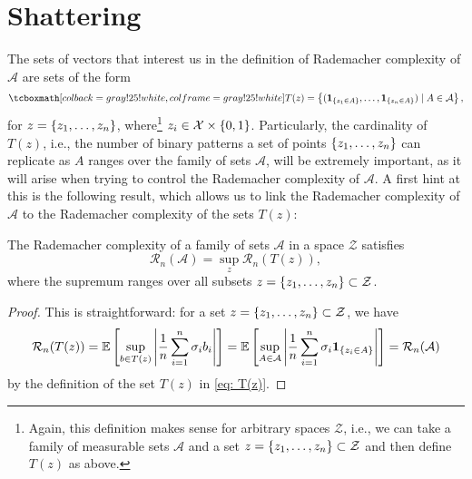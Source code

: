 \section{Shattering}
\label{sec: shattering}

The sets of vectors that interest us in the definition of Rademacher complexity of
$\mathcal{A}$ are sets of the form
\begin{equation}
\label{eq: T(z)}
    \highlightMath{
        T(z) = \set{(\indSet{z_1 \in A}, \dots, \indSet{z_n \in A}) \with A \in \mathcal{A}},
    }
\end{equation}
for $z = \left\{z_1, \dots, z_n\right\}$, where\footnote{Again, this definition makes sense for arbitrary spaces $\mathcal{Z}$, i.e., we can take a family of measurable sets $\mathcal{A}$ and a set $z = \left\{z_1, \dots, z_n\right\} \subset \mathcal{Z}$ and then define $T(z)$ as above.} $z_i \in \mathcal{X} \times \left\{0, 1\right\}$. Particularly, the cardinality of $T(z)$, i.e., the number of binary patterns a set of points $\left\{z_1, \dots, z_n\right\}$ can replicate as $A$ ranges over the family of sets $\mathcal{A}$, will be extremely important, as it will arise when trying to control the Rademacher complexity of $\mathcal{A}$. A first hint at this is the following result, which allows us to link the Rademacher complexity of $\mathcal{A}$ to the Rademacher complexity of the sets $T(z)$:

\begin{lemma}
\label{lem: rademacher complexity of family of sets}
The Rademacher complexity of a family of sets $\mathcal{A}$ in a space $\mathcal{Z}$ satisfies
\[
    \mathcal{R}_n(\mathcal{A}) = \sup_z \mathcal{R}_n(T(z)),
\]
where the supremum ranges over all subsets $z = \left\{z_1, \dots, z_n\right\} \subset \mathcal{Z}$.
\end{lemma}

\begin{proof}
This is straightforward: for a set $z = \left\{z_1, \dots, z_n\right\} \subset \mathcal{Z}$, we have
\[
    \mathcal{R}_n(T(z)) = \mathbb{E}\left[ \sup_{b \in T(z)} \abs{\frac{1}{n} \sum_{i=1}^n \sigma_i b_i}\right] = \mathbb{E}\left[ \sup_{A \in \mathcal{A}} \abs{\frac{1}{n} \sum_{i=1}^n \sigma_i \mathbf{1}_{\left\{z_i \in A\right\}}}\right] = \mathcal{R}_n(\mathcal{A})
\]
by the definition of the set $T(z)$ in \eqref{eq: T(z)}.
\end{proof}


